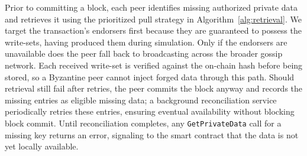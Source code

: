 Prior to committing a block, each peer identifies missing authorized private data and retrieves it using the prioritized pull strategy in Algorithm~\ref{alg:retrieval}. We target the transaction's endorsers first because they are guaranteed to possess the write-sets, having produced them during simulation. Only if the endorsers are unavailable does the peer fall back to broadcasting across the broader gossip network. Each received write-set is verified against the on-chain hash before being stored, so a Byzantine peer cannot inject forged data through this path.
Should retrieval still fail after retries, the peer commits the block anyway and records the missing entries as eligible missing data; a background reconciliation service periodically retries these entries, ensuring eventual availability without blocking block commit. Until reconciliation completes, any \texttt{GetPrivateData} call for a missing key returns an error, signaling to the smart contract that the data is not yet locally available.

